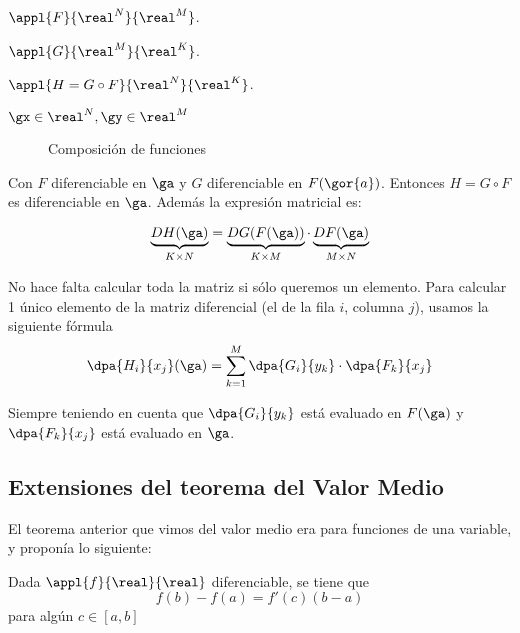 $\appl{F}{\real^N}{\real^M}$. 

$\appl{G}{\real^M}{\real^K}$.

$\appl{H=G\circ F}{\real^N}{\real^K}$.

$ \gx \in \real^N, \gy \in \real^M$

\begin{wrapfigure}{r}{0.3\textwidth}
\begin{center}
\end{center}
\caption{Composición de funciones}
\end{wrapfigure}

Con $F$ diferenciable en $\ga$ y $G$ diferenciable en $F(\gor{a})$. Entonces $H=G\circ F$ es diferenciable en $\ga $.
Además la expresión matricial es:

\[ \underbrace{DH(\ga)}_{K\times N} = \underbrace{DG(F(\ga))}_{K\times M}\cdot \underbrace{DF(\ga)}_{M\times N} \]
 
No hace falta calcular toda la matriz si sólo queremos un elemento. Para calcular 1 único elemento de la matriz diferencial (el de la fila $i$, columna $j$), usamos la siguiente fórmula
\[ \dpa{H_i}{x_j}(\ga) = \sum_{k=1}^M \dpa{G_i}{y_k}\cdot\dpa{F_k}{x_j} \]

Siempre teniendo en cuenta que $\displaystyle\dpa{G_i}{y_k}$ está evaluado en $F(\ga)$ y $\displaystyle\dpa{F_k}{x_j}$ está evaluado en $\ga$.

\subsection{Extensiones del teorema del Valor Medio}

El teorema anterior que vimos del valor medio era para funciones de una variable, y proponía lo siguiente:
\begin{theorem}
\label{thmTVM1var}
Dada $\appl{f}{\real}{\real}$ diferenciable, se tiene que \[ f(b)-f(a) = f'(c)(b-a)\] para algún $c\in[a,b]$
\end{theorem}

